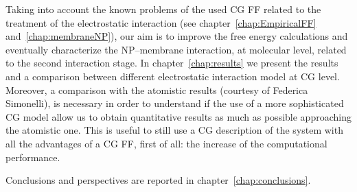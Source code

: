 Taking into account the known problems of the used \ac{CG} \ac{FF} related to the treatment of the electrostatic interaction (see chapter~\ref{chap:EmpiricalFF} and~\ref{chap:membraneNP}), our aim is to improve the free energy calculations and eventually characterize the \ac{NP}--membrane interaction, at molecular level, related to the second interaction stage. In chapter~\ref{chap:results} we present the results and a comparison between different electrostatic interaction model at \ac{CG} level. Moreover, a comparison with the atomistic results (courtesy of Federica Simonelli), is necessary in order to understand if the use of a more sophisticated \ac{CG} model allow us to obtain quantitative results as much as possible approaching the atomistic one. This is useful to still use a \ac{CG} description of the system with all the advantages of a \ac{CG} \ac{FF}, first of all: the increase of the computational performance.

Conclusions and perspectives are reported in chapter~\ref{chap:conclusions}.


\restoretoc
\endgroup